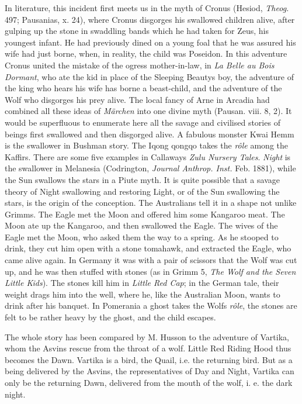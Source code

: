\documentclass[14pt,a4paper]{memoir}
\begin{document}
{In literature, this incident first meets us in the myth of Cronus
(Hesiod, \emph{Theog.} 497; Pausanias, x. 24), where Cronus disgorges
his swallowed children alive, after gulping up the stone in swaddling
bands which he had taken for Zeus, his youngest infant. He had
previously dined on a young foal that he was assured his wife had just
borne, when, in reality, the child was Poseidon. In this adventure
Cronus united the mistake of the ogress mother-in-law, in \emph{La Belle
au Bois Dormant}, who ate the kid in place of the Sleeping
Beauty\textquotesingle s boy, the adventure of the king who hears his
wife has borne a beast-child, and the adventure of the Wolf who
disgorges his prey alive. The local fancy of Arne in Arcadia had
combined all these ideas of \emph{Märchen} into one divine myth (Pausan.
viii. 8, 2). It would be superfluous to enumerate here all the savage
and civilised stories of beings first swallowed and then disgorged
alive. A fabulous monster Kwai Hemm is the swallower in Bushman story.
The Iqong qongqo takes the \emph{rôle} among the Kaffirs. There are some
five examples in Callaway\textquotesingle s \emph{Zulu Nursery Tales}.
\emph{Night} is the swallower in Melanesia (Codrington, \emph{Journal
Anthrop. Inst.} Feb. 1881), while the Sun swallows the stars in a Piute
myth. It is quite possible that a savage theory of Night swallowing and
restoring Light, or of the Sun swallowing the stars, is the origin of
the
conception.
The Australians tell it in a shape not unlike Grimm\textquotesingle s.
The Eagle met the Moon and offered him some Kangaroo meat. The Moon ate
up the Kangaroo, and then swallowed the Eagle. The wives of the Eagle
met the Moon, who asked them the way to a spring. As he stooped to
drink, they cut him open with a stone tomahawk, and extracted the Eagle,
who came alive
again.
In Germany it was with a pair of scissors that the Wolf was cut up, and
he was then stuffed with stones (as in Grimm 5, \emph{The Wolf and the
Seven Little Kids}). The stones kill him in \emph{Little Red Cap}; in
the German tale, their weight drags him into the well, where he, like
the Australian Moon, wants to drink after his banquet. In Pomerania a
ghost takes the Wolf\textquotesingle s \emph{rôle}, the stones are felt
to be rather \textquotesingle heavy\textquotesingle{} by the ghost, and
the child
escapes.

The whole story has been compared by M. Husson to the adventure of
Vartika, whom the Asvins rescue from the throat of a wolf. Little Red
Riding Hood thus becomes the Dawn. Vartika is a bird, the Quail,
\textquotesingle i.e. the returning bird. But as a being delivered by
the Asvins, the representatives of Day and Night, Vartika can only be
the returning Dawn, delivered from the mouth of the wolf, i. e. the dark
night.\textquotesingle{}

}
\end{document}

